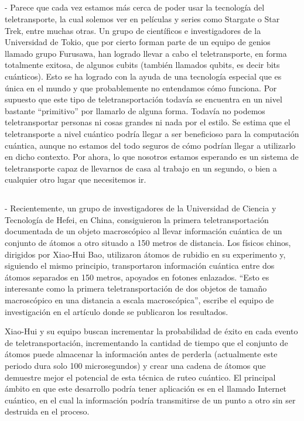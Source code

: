 \documentclass{bmcart}
\begin{document}
\subsection*{}
-	Parece que cada vez estamos más cerca de poder usar la tecnología del teletransporte, la cual solemos ver en películas y series como Stargate o Star Trek, entre muchas otras. Un grupo de científicos e investigadores de la Universidad de Tokio, que por cierto forman parte de un equipo de genios llamado grupo Furusawa, han logrado llevar a cabo el teletransporte, en forma totalmente exitosa, de algunos cubits (también llamados qubits, es decir bits cuánticos). Esto se ha logrado con la ayuda de una tecnología especial que es única en el mundo y que probablemente no entendamos cómo funciona. Por supuesto que este tipo de teletransportación todavía se encuentra en un nivel bastante “primitivo” por llamarlo de alguna forma. 
Todavía no podemos teletransportar personas ni cosas grandes ni nada por el estilo. Se estima que el teletransporte a nivel cuántico podría llegar a ser beneficioso para la computación cuántica, aunque no estamos del todo seguros de cómo podrían llegar a utilizarlo en dicho contexto. Por ahora, lo que nosotros estamos esperando es un sistema de teletransporte capaz de llevarnos de casa al trabajo en un segundo, o bien a cualquier otro lugar que necesitemos ir.
\subsection*{}
-	Recientemente, un grupo de investigadores de la Universidad de Ciencia y Tecnología de Hefei, en China, consiguieron la primera teletransportación documentada de un objeto macroscópico al llevar información cuántica de un conjunto de átomos a otro situado a 150 metros de distancia. 
Los físicos chinos, dirigidos por Xiao-Hui Bao, utilizaron átomos de rubidio en su experimento y, siguiendo el mismo principio, transportaron información cuántica entre dos átomos separados en 150 metros, apoyados en fotones enlazados. 
“Esto es interesante como la primera teletransportación de dos objetos de tamaño macroscópico en una distancia a escala macroscópica”, escribe el equipo de investigación en el artículo donde se publicaron los resultados. 

Xiao-Hui y su equipo buscan incrementar la probabilidad de éxito en cada evento de teletransportación, incrementando la cantidad de tiempo que el conjunto de átomos puede almacenar la información antes de perderla (actualmente este periodo dura solo 100 microsegundos) y crear una cadena de átomos que demuestre mejor el potencial de esta técnica de ruteo cuántico. 
El principal ámbito en que este desarrollo podría tener aplicación es en el llamado Internet cuántico, en el cual la información podría transmitirse de un punto a otro sin ser destruida en el proceso.
\end{document}
